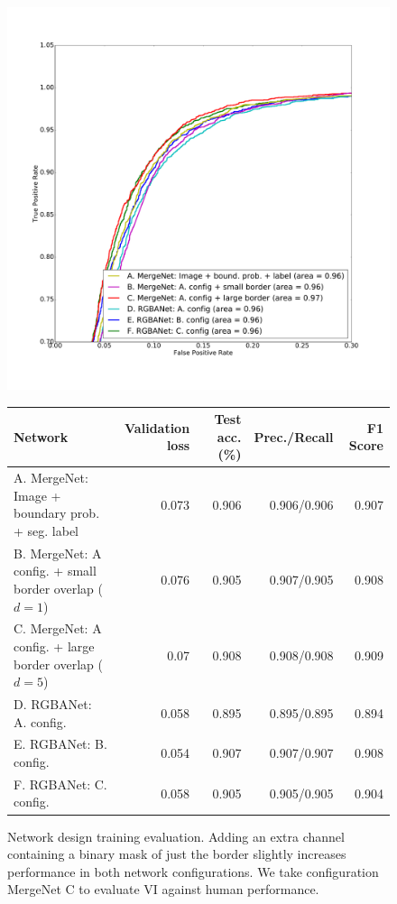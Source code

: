 \begin{figure}

\includegraphics[width=.5\textwidth]{gfx/roc_plot.pdf}


\begin{tabular}{l rrrr}
\toprule
Network & Validation loss & Test acc. ~(\%) & Prec./Recall & \hspace{0.1cm} F1 Score \\
\midrule
A. MergeNet: Image + boundary prob. + seg. label & 0.073 & 0.906 & 0.906/0.906 & 0.907 \\
B. MergeNet: A config. + small border overlap ($d=1$) & 0.076 & 0.905 & 0.907/0.905 & 0.908 \\
C. MergeNet: A config. + large border overlap ($d=5$) & 0.07 & 0.908 & 0.908/0.908 & 0.909 \\
D. RGBANet: A. config. & 0.058 & 0.895 & 0.895/0.895 & 0.894 \\
E. RGBANet: B. config. & 0.054 & 0.907 & 0.907/0.907 & 0.908 \\
F. RGBANet: C. config. & 0.058 & 0.905 & 0.905/0.905 & 0.904\\
\bottomrule
\end{tabular}

 \caption{Network design training evaluation. Adding an extra channel containing a binary mask of just the border slightly increases performance in both network configurations. We take configuration MergeNet C to evaluate VI against human performance.}
 \label{fig:trainingperformance}
\end{figure}

